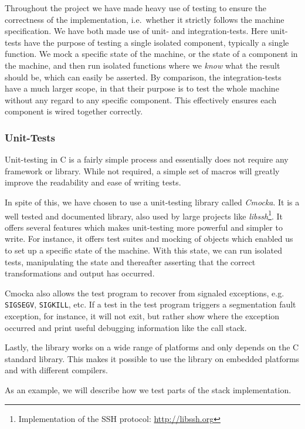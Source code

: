 Throughout the project we have made heavy use of testing to ensure the
correctness of the implementation, i.e.~whether it strictly follows the machine
specification. We have both made use of unit- and integration-tests. Here
unit-tests have the purpose of testing a single isolated component, typically a
single function. We mock a specific state of the machine, or the state of a
component in the machine, and then run isolated functions where we {\it know}
what the result should be, which can easily be asserted. By comparison, the
integration-tests have a much larger scope, in that their purpose is to test the
whole machine without any regard to any specific component. This effectively
ensures each component is wired together correctly.

\subsubsection{Unit-Tests}

Unit-testing in C is a fairly simple process and essentially does not require
any framework or library. While not required, a simple set of macros will
greatly improve the readability and ease of writing tests.

In spite of this, we have chosen to use a unit-testing library called {\it
  Cmocka}\cite{cmocka}. It is a well tested and documented library, also used by
large projects like {\it libssh}\footnote{Implementation of the SSH protocol:
  \url{http://libssh.org}}. It offers several features which makes unit-testing
more powerful and simpler to write. For instance, it offers test suites and
mocking of objects which enabled us to set up a specific state of the
machine. With this state, we can run isolated tests, manipulating the state and
thereafter asserting that the correct transformations and output has occurred.

Cmocka also allows the test program to recover from signaled exceptions,
e.g. {\tt SIGSEGV}, {\tt SIGKILL}, etc. If a test in the test program triggers a
segmentation fault exception, for instance, it will not exit, but rather show
where the exception occurred and print useful debugging information like the
call stack.

Lastly, the library works on a wide range of platforms and only depends on the C
standard library. This makes it possible to use the library on embedded
platforms and with different compilers.

As an example, we will describe how we test parts of the stack implementation.

